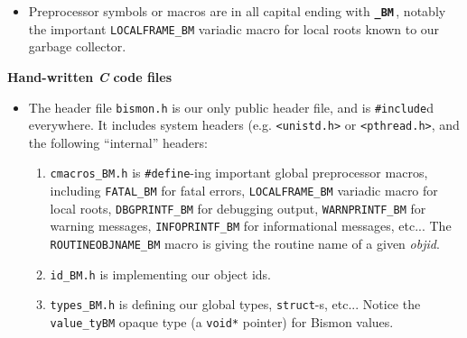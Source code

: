 \begin{appendices}
\begin{itemize}
              \item Preprocessor symbols or macros are in all capital
                ending with {\texttt{\textbf{\_BM}}}\,, notably the
                important \texttt{LOCALFRAME\_BM} variadic macro for
                local roots known to our garbage collector.
\end{itemize}

{\large \textbf{Hand-written \emph{C} code files}}

\begin{itemize}
  \item The header file \texttt{bismon.h} is our
     only public header file,
    and is \texttt{\#include}d everywhere. It includes system headers
    (e.g. \texttt{<unistd.h>} or \texttt{<pthread.h>}, and the
    following ``internal'' headers:
    \begin{enumerate}
      \item \texttt{cmacros\_BM.h} is \texttt{\#define}-ing important
         global
        preprocessor macros, including \texttt{FATAL\_BM} for fatal
        errors, \texttt{LOCALFRAME\_BM} variadic macro for local
        roots, \texttt{DBGPRINTF\_BM} for debugging output,
        \texttt{WARNPRINTF\_BM} for warning messages,
        \texttt{INFOPRINTF\_BM} for informational messages, etc... The
        \texttt{ROUTINEOBJNAME\_BM} macro
        is giving the routine name of  a given
        \textit{objid}.

      \item \texttt{id\_BM.h} is implementing
         our object ids.

      \item \texttt{types\_BM.h} is defining our global types,
        \texttt{struct}-s, etc... Notice the \texttt{value\_tyBM}
        opaque type (a \texttt{void*} pointer) for Bismon values.


\end{enumerate}
\end{itemize}
\end{appendices}
